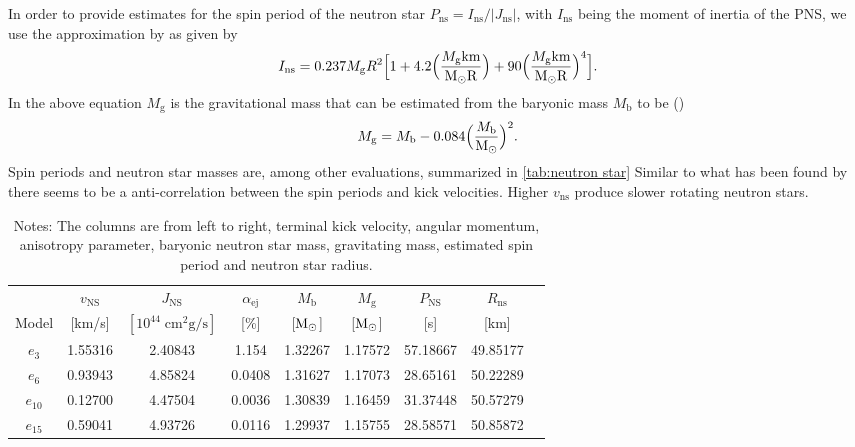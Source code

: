 \documentclass[fleqn,usenatbib]{mnras}
\newcommand{\solm}{\xspace\ensuremath{\rm{M_{\odot}}}}
\newcommand{\rns}{$R_{\mathrm{ns}}$\xspace\xspace}
\begin{document}
In order to provide estimates for the spin period of the neutron star $P_{\mathrm{ns}}=I_{\mathrm{ns}}/|J_{\mathrm{ns}}|$, with $I_{\mathrm{ns}}$ being the moment of inertia of the PNS, we use the approximation by \citet{Lattimer2005} as given by
\begin{equation}
    I_{\mathrm{ns}} = 0.237M_{\mathrm{g}}R^2\Big[ 1 + 
    4.2 \Big( \frac{M_{\mathrm{g}} \mathrm{km }}{\solm R}\Big)  + 
    90 \Big( \frac{M_{\mathrm{g}} \mathrm{km }}{\solm R}\Big)^4
    \Big].
    \label{equ: ins}
\end{equation}
In the above equation $M_{\mathrm{g}}$ is the gravitational mass that can be estimated from the baryonic mass $M_{\mathrm{b}}$ to be (\citet{Lattimer2000})
\begin{equation}
    M_{\mathrm{g}} = M_{\mathrm{b}} - 0.084\Big( \frac{M_{\mathrm{b}}}{\solm}\Big)^2.
\end{equation}Spin periods and neutron star masses are, among other evaluations, summarized in \autoref{tab:neutron star}
Similar to what has been found by \citet{Muller2018b} there seems to be a anti-correlation between the spin periods and kick velocities. Higher $v_{\mathrm{ns}}$ produce slower rotating neutron stars.

\begin{table}
\centering
\begin{tabular}{ccccccccc}
            & $v_{\mathrm{NS}}$& $J_{\mathrm{NS}}$    & $\alpha_{\mathrm{ej}}$& $M_{\mathrm{b}}$& $M_{\mathrm{g}}$ & $P_{\mathrm{NS}}$& \rns \\
    Model & [km/s]           & $[10^{44}\; \mathrm{cm^2 g/s}]$ &         [\%]              &  [\solm]        &  [\solm]         & [s]              &  [km] \\
    
    \hline 
    $e_{3}$  &      1.55316 &             2.40843 &   1.154 &     1.32267 &      1.17572 &  57.18667 &  49.85177 \\
    $e_{6}$  &      0.93943 &             4.85824 &   0.0408 &     1.31627 &      1.17073 &  28.65161 &  50.22289 \\
    $e_{10}$ &      0.12700 &             4.47504 &   0.0036 &     1.30839 &      1.16459 &  31.37448 &  50.57279 \\
    $e_{15}$ &      0.59041 &             4.93726 &   0.0116 &     1.29937 &      1.15755 &  28.58571 &  50.85872
\end{tabular}
\caption{Notes: The columns are from left to right, terminal kick velocity, angular momentum, anisotropy parameter, baryonic neutron star mass, gravitating mass, estimated spin period and neutron star radius.}
\label{tab:neutron star}
\end{table}
\end{document}
